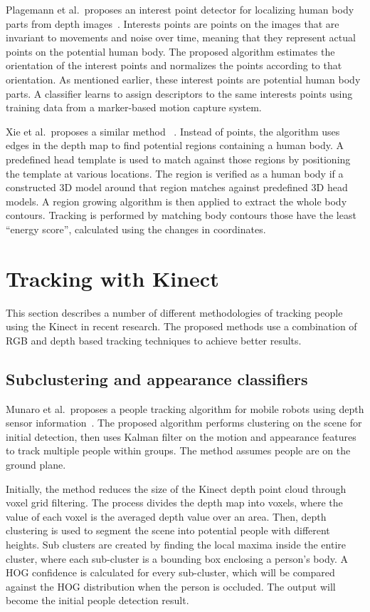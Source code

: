 Plagemann et al.\ proposes an interest point detector for localizing human body parts from depth images~\cite{plagemann_body_from_depth}. Interests points are points on the images that are invariant to movements and noise over time, meaning that they represent actual points on the potential human body. The proposed algorithm estimates the orientation of the interest points and normalizes the points according to that orientation. As mentioned earlier, these interest points are potential human body parts. A classifier learns to assign descriptors to the same interests points using training data from a marker-based motion capture system.

Xie et al.\ proposes a similar method ~\cite{xia_2d_depth_3d_model}. Instead of points, the algorithm uses edges in the depth map to find potential regions containing a human body. A predefined head template is used to match against those regions by positioning the template at various locations. The region is verified as a human body if a constructed 3D model around that region matches against predefined 3D head models. A region growing algorithm is then applied to extract the whole body contours. Tracking is performed by matching body contours those have the least ``energy score'', calculated using the changes in coordinates.

\section{Tracking with Kinect}

This section describes a number of different methodologies of tracking people using the Kinect in recent research. The proposed methods use a combination of RGB and depth based tracking techniques to achieve better results.

\subsection{Subclustering and appearance classifiers}

Munaro et al.\ proposes a people tracking algorithm for mobile robots using depth sensor information~\cite{munaro_tracking_within_groups_with_mobile_robot, munaro_tracking_2}. The proposed algorithm performs clustering on the scene for initial detection, then uses Kalman filter on the motion and appearance features to track multiple people within groups. The method assumes people are on the ground plane.

Initially, the method reduces the size of the Kinect depth point cloud through voxel grid filtering. The process divides the depth map into voxels, where the value of each voxel is the averaged depth value over an area. Then, depth clustering is used to segment the scene into potential people with different heights. Sub clusters are created by finding the local maxima inside the entire cluster, where each sub-cluster is a bounding box enclosing a person's body. A HOG confidence is calculated for every sub-cluster, which will be compared against the HOG distribution when the person is occluded. The output will become the initial people detection result.

